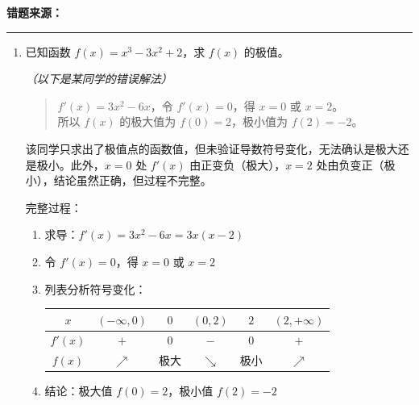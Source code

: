 \vspace{0.5em}
\noindent\textbf{错题来源：}\cuotiSource

\vspace{1em}
\hrule
\vspace{1em}


\begin{enumerate}[itemsep=1.2em, left=0pt, label={}]

\item \typeFill\quad{}

\medskip
\noindent 已知函数 $f(x)=x^3-3x^2+2$，求 $f(x)$ 的极值。

\medskip
\noindent\textit{\color{gray!70!black}（以下是某同学的错误解法）}
\begin{quote}
    \color{gray!50!black}
    $f'(x)=3x^2-6x$，令 $f'(x)=0$，得 $x=0$ 或 $x=2$。\\
    所以 $f(x)$ 的极大值为 $f(0)=2$，极小值为 $f(2)=-2$。
\end{quote}

\begin{solution}
    \par{}%
    该同学只求出了极值点的函数值，但未验证导数符号变化，无法确认是极大还是极小。此外，$x=0$ 处 $f'(x)$ 由正变负（极大），$x=2$ 处由负变正（极小），结论虽然正确，但过程不完整。

    \par{}%
    完整过程：
    \begin{enumerate}[label=(\arabic*), leftmargin=2em]
        \item 求导：$f'(x)=3x^2-6x=3x(x-2)$
        \item 令 $f'(x)=0$，得 $x=0$ 或 $x=2$
        \item 列表分析符号变化：
        \begin{center}
        \begin{tabular}{c|ccccc}
            $x$ & $(-\infty,0)$ & $0$ & $(0,2)$ & $2$ & $(2,+\infty)$ \\
            \hline
            $f'(x)$ & $+$ & $0$ & $-$ & $0$ & $+$ \\
            $f(x)$ & $\nearrow$ & 极大 & $\searrow$ & 极小 & $\nearrow$
        \end{tabular}
        \end{center}
        \item 结论：极大值 $f(0)=2$，极小值 $f(2)=-2$
    \end{enumerate}


\end{solution}
\end{enumerate}
